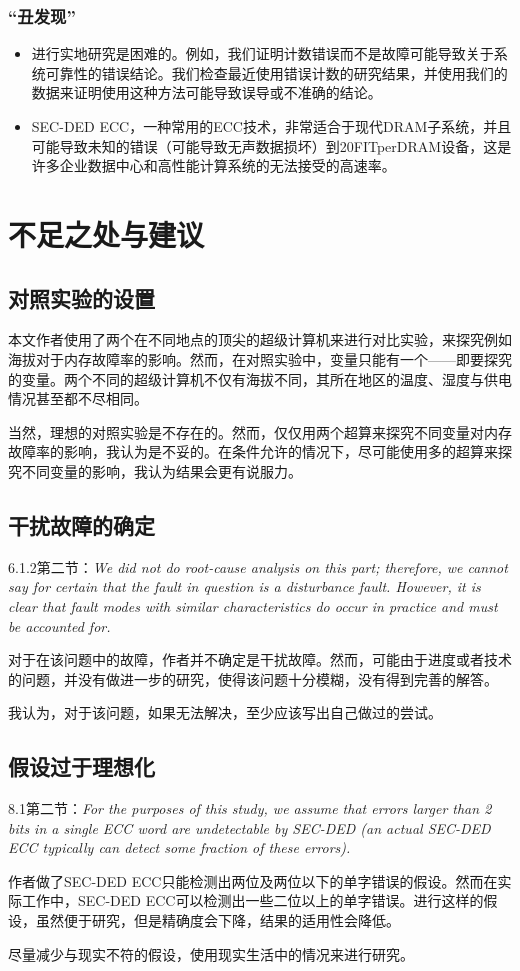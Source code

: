 \documentclass[11pt, a4paper]{article}
\begin{document}
\subsubsection{“丑发现”}
\begin{itemize}
\item 进行实地研究是困难的。例如，我们证明计数错误而不是故障可能导致关于系统可靠性的错误结论。我们检查最近使用错误计数的研究结果，并使用我们的数据来证明使用这种方法可能导致误导或不准确的结论。
\item SEC-DED ECC，一种常用的ECC技术，非常适合于现代DRAM子系统，并且可能导致未知的错误（可能导致无声数据损坏）到20FITperDRAM设备，这是许多企业数据中心和高性能计算系统的无法接受的高速率。
\end{itemize}

\section{不足之处与建议}

\subsection{对照实验的设置}

本文作者使用了两个在不同地点的顶尖的超级计算机来进行对比实验，来探究例如海拔对于内存故障率的影响。然而，在对照实验中，变量只能有一个——即要探究的变量。两个不同的超级计算机不仅有海拔不同，其所在地区的温度、湿度与供电情况甚至都不尽相同。

当然，理想的对照实验是不存在的。然而，仅仅用两个超算来探究不同变量对内存故障率的影响，我认为是不妥的。在条件允许的情况下，尽可能使用多的超算来探究不同变量的影响，我认为结果会更有说服力。

\subsection{干扰故障的确定}

6.1.2第二节：\emph{We did not do root-cause analysis on this part; therefore, we cannot say for certain that the fault in question is a disturbance fault. However, it is clear that fault modes with similar characteristics do occur in practice and must be accounted for.}

对于在该问题中的故障，作者并不确定是干扰故障。然而，可能由于进度或者技术的问题，并没有做进一步的研究，使得该问题十分模糊，没有得到完善的解答。

我认为，对于该问题，如果无法解决，至少应该写出自己做过的尝试。

\subsection{假设过于理想化}

8.1第二节：\emph{For the purposes of this study, we assume that errors larger than 2 bits in a single ECC word are undetectable by SEC-DED (an actual SEC-DED ECC typically can detect some fraction of these errors).}

作者做了SEC-DED ECC只能检测出两位及两位以下的单字错误的假设。然而在实际工作中，SEC-DED ECC可以检测出一些二位以上的单字错误。进行这样的假设，虽然便于研究，但是精确度会下降，结果的适用性会降低。

尽量减少与现实不符的假设，使用现实生活中的情况来进行研究。
\end{document}
